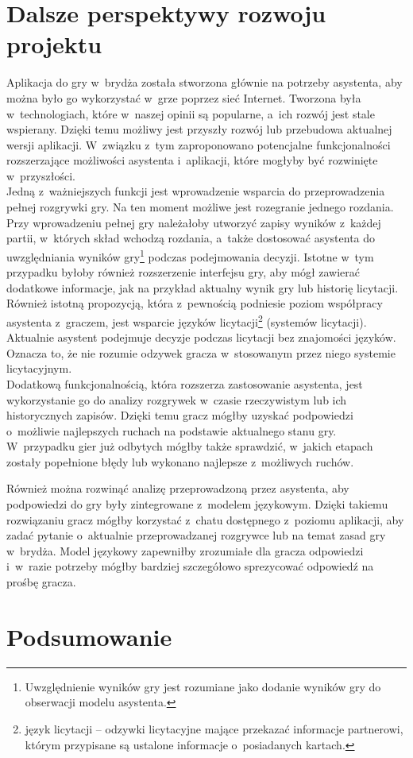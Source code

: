 \FloatBarrier

\section{Dalsze perspektywy rozwoju projektu}

Aplikacja do gry w~brydża została stworzona głównie
na potrzeby asystenta, aby można było go wykorzystać w~grze
poprzez sieć Internet. Tworzona była w~technologiach, które
w~naszej opinii są popularne, a~ich rozwój jest stale wspierany.
Dzięki temu możliwy jest przyszły rozwój lub przebudowa aktualnej
wersji aplikacji.
W~związku z~tym zaproponowano potencjalne funkcjonalności rozszerzające
możliwości asystenta i~aplikacji, które
mogłyby być rozwinięte w~przyszłości. \\

Jedną z~ważniejszych funkcji jest wprowadzenie wsparcia do
przeprowadzenia pełnej rozgrywki gry. Na ten moment możliwe jest
rozegranie jednego rozdania. Przy wprowadzeniu pełnej gry należałoby
utworzyć zapisy wyników z~każdej partii, w~których skład wchodzą rozdania,
a~także dostosować asystenta
do uwzględniania wyników gry\footnote{Uwzględnienie wyników gry jest
  rozumiane jako dodanie wyników gry do obserwacji modelu asystenta.}
podczas podejmowania decyzji. Istotne w~tym przypadku
byłoby również rozszerzenie interfejsu gry, aby mógł zawierać
dodatkowe informacje, jak na przykład aktualny wynik gry lub
historię licytacji. \\

Również istotną propozycją, która z~pewnością podniesie poziom
współpracy asystenta z~graczem, jest wsparcie języków licytacji\footnote{
  język licytacji -- odzywki licytacyjne mające przekazać informacje
  partnerowi, którym przypisane
  są ustalone informacje o~posiadanych kartach.
} (systemów licytacji).
Aktualnie asystent podejmuje decyzje podczas licytacji bez znajomości
języków. Oznacza to, że nie rozumie odzywek gracza w~stosowanym przez
niego systemie licytacyjnym. \\

Dodatkową funkcjonalnością, która rozszerza zastosowanie asystenta, jest
wykorzystanie go do analizy rozgrywek w~czasie rzeczywistym lub
ich historycznych zapisów. Dzięki temu gracz mógłby uzyskać podpowiedzi
o~możliwie najlepszych ruchach na podstawie aktualnego stanu gry.
W~przypadku gier już odbytych mógłby także sprawdzić, w~jakich etapach
zostały popełnione błędy lub wykonano najlepsze z~możliwych ruchów.

Również można rozwinąć analizę przeprowadzoną przez asystenta, aby
podpowiedzi do gry były zintegrowane z~modelem językowym. Dzięki
takiemu rozwiązaniu gracz mógłby korzystać z~chatu dostępnego
z~poziomu aplikacji, aby zadać pytanie o~aktualnie przeprowadzanej
rozgrywce lub na temat zasad gry w~brydża. Model językowy zapewniłby
zrozumiałe dla gracza odpowiedzi i~w~razie potrzeby mógłby bardziej
szczegółowo sprezycować odpowiedź na prośbę gracza.

\section{Podsumowanie}


